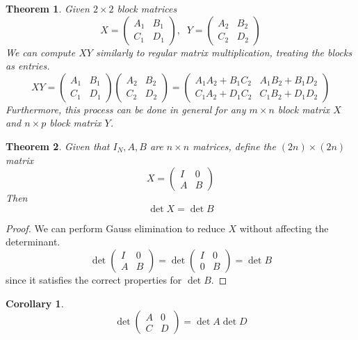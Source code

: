 \documentclass{article}
\newtheorem{theorem}{Theorem}[section]
\newtheorem{corollary}{Corollary}[theorem]
\theoremstyle{remark}
\theoremstyle{definition}
\begin{document}
    \begin{theorem}
    Given $2 \times 2$ block matrices
    \[X = \begin{pmatrix}
    A_1&B_1\\C_1&D_1
    \end{pmatrix}, \; \; Y = \begin{pmatrix}
    A_2&B_2\\C_2&D_2
    \end{pmatrix}\]
    We can compute $X Y$ similarly to regular matrix multiplication, treating the blocks as entries. 
    \[ X Y = \begin{pmatrix}
    A_1&B_1\\C_1&D_1
    \end{pmatrix} \begin{pmatrix}
    A_2&B_2\\C_2&D_2
    \end{pmatrix} = \begin{pmatrix}
    A_1 A_2 + B_1 C_2 & A_1 B_2 + B_1 D_2 \\
    C_1 A_2 + D_1 C_2 & C_1 B_2 + D_1 D_2 
    \end{pmatrix}\]
    Furthermore, this process can be done in general for any $m \times n$ block matrix $X$ and $n \times p$ block matrix $Y$. 
    \end{theorem}

    \begin{theorem}
    Given that $I_N, A, B$ are $n \times n$ matrices, define the $(2n) \times (2n)$ matrix 
    \[X = \begin{pmatrix}
    I & 0 \\ A & B
    \end{pmatrix}\]
    Then 
    \[\det{X} = \det{B}\]
    \end{theorem}
    \begin{proof}
    We can perform Gauss elimination to reduce $X$ without affecting the determinant.
    \[\det{\begin{pmatrix}
    I&0\\A&B
    \end{pmatrix}} = \det{
    \begin{pmatrix}
    I&0\\
    0&B
    \end{pmatrix}} = \det{B}\]
    since it satisfies the correct properties for $\det{B}$. 
    \end{proof}

    \begin{corollary}
    \[\det{\begin{pmatrix}
    A&0\\C&D
    \end{pmatrix}} = \det{A} \det{D}\]
    \end{corollary}
\end{document}

